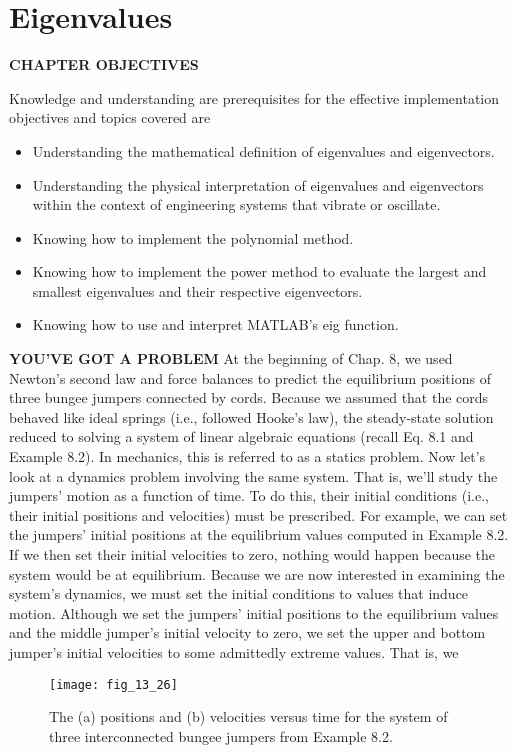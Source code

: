 \documentclass[../main.tex]{subfiles}
\begin{document}
\theoremstyle{definition}

\chapter{Eigenvalues}
\begin{center}
\textbf{CHAPTER OBJECTIVES}
\end{center}
Knowledge and understanding are prerequisites for the effective implementation objectives and topics covered are
\begin{itemize}
\item Understanding the mathematical definition of eigenvalues and eigenvectors.
\item Understanding the physical interpretation of eigenvalues and eigenvectors within
the context of engineering systems that vibrate or oscillate.
\item Knowing how to implement the polynomial method.
\item Knowing how to implement the power method to evaluate the largest and smallest eigenvalues and their respective eigenvectors.
\item Knowing how to use and interpret MATLAB's eig function.
\end{itemize}
\textbf{YOU’VE GOT A PROBLEM }
At the beginning of Chap. 8, we used Newton’s second law and force balances to predict the equilibrium positions of three bungee jumpers connected by cords. Because
we assumed that the cords behaved like ideal springs (i.e., followed Hooke’s law),
the steady-state solution reduced to solving a system of linear algebraic equations (recall
Eq. 8.1 and Example 8.2). In mechanics, this is referred to as a statics problem.
Now let’s look at a dynamics problem involving the same system. That is, we’ll study the
jumpers’ motion as a function of time. To do this, their initial conditions (i.e., their initial positions and velocities) must be prescribed. For example, we can set the jumpers’ initial positions at the equilibrium values computed in Example 8.2. If we then set their initial velocities
to zero, nothing would happen because the system would be at equilibrium.
Because we are now interested in examining the system’s dynamics, we must set the
initial conditions to values that induce motion. Although we set the jumpers’ initial positions to the equilibrium values and the middle jumper’s initial velocity to zero, we set the
upper and bottom jumper’s initial velocities to some admittedly extreme values. That is, we

\begin{figure}[H]
		\centering
		\texttt{[image: fig\_13\_26]}
	   \caption{\textsf{The (a) positions and (b) velocities versus time for the system of three interconnected bungee
jumpers from Example 8.2.}}
	   \label{fig:fig_13_26}
\end{figure}
\end{document}
